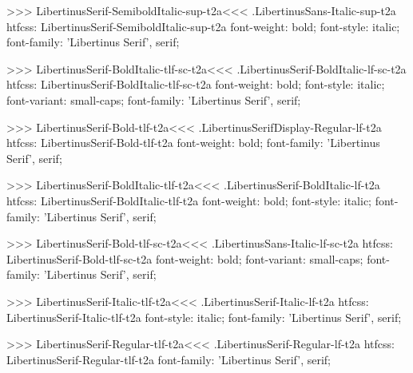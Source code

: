 {{{{{>>>
\<LibertinusSerif-SemiboldItalic-sup-t2a\><<<
.LibertinusSans-Italic-sup-t2a
htfcss:  LibertinusSerif-SemiboldItalic-sup-t2a  font-weight: bold; font-style: italic; font-family: 'Libertinus Serif', serif;

>>>
\<LibertinusSerif-BoldItalic-tlf-sc-t2a\><<<
.LibertinusSerif-BoldItalic-lf-sc-t2a
htfcss:  LibertinusSerif-BoldItalic-tlf-sc-t2a  font-weight: bold; font-style: italic; font-variant: small-caps; font-family: 'Libertinus Serif', serif;

>>>
\<LibertinusSerif-Bold-tlf-t2a\><<<
.LibertinusSerifDisplay-Regular-lf-t2a
htfcss:  LibertinusSerif-Bold-tlf-t2a  font-weight: bold; font-family: 'Libertinus Serif', serif;

>>>
\<LibertinusSerif-BoldItalic-tlf-t2a\><<<
.LibertinusSerif-BoldItalic-lf-t2a
htfcss:  LibertinusSerif-BoldItalic-tlf-t2a  font-weight: bold; font-style: italic; font-family: 'Libertinus Serif', serif;

>>>
\<LibertinusSerif-Bold-tlf-sc-t2a\><<<
.LibertinusSans-Italic-lf-sc-t2a
htfcss:  LibertinusSerif-Bold-tlf-sc-t2a  font-weight: bold; font-variant: small-caps; font-family: 'Libertinus Serif', serif;

>>>
\<LibertinusSerif-Italic-tlf-t2a\><<<
.LibertinusSerif-Italic-lf-t2a
htfcss:  LibertinusSerif-Italic-tlf-t2a  font-style: italic; font-family: 'Libertinus Serif', serif;

>>>
\<LibertinusSerif-Regular-tlf-t2a\><<<
.LibertinusSerif-Regular-lf-t2a
htfcss:  LibertinusSerif-Regular-tlf-t2a  font-family: 'Libertinus Serif', serif;

}}}}}
